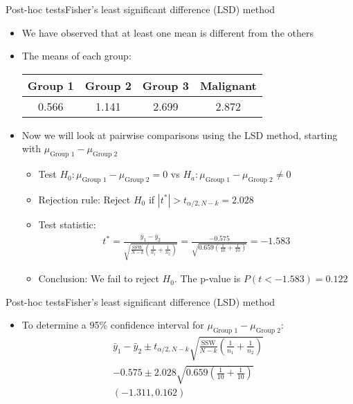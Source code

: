 \documentclass[xcolor=dvipsnames]{beamer}
\begin{document}
\begin{frame}{Post-hoc tests}{Fisher's least significant difference (LSD) method}
	\begin{itemize}
		\item We have observed that at least one mean is different from the others \pause
		\item The means of each group: \pause
		\begin{center}
			\begin{tabular}{|c|c|c|c|}
				\hline 
				  Group 1 & Group 2 & Group 3 & Malignant \\ \hline \hline
				 0.566 & 1.141 & 2.699 &  2.872 \\ \hline
			\end{tabular}
		\end{center} \pause
	\vspace{2mm}
		\item Now we will look at pairwise comparisons using the LSD method, starting with $\mu_{\text{Group 1}}-\mu_{\text{Group 2}}$ \pause
		\begin{itemize}
			\item Test $H_0: \mu_{\text{Group 1}}-\mu_{\text{Group 2}} =0$ vs $H_a: \mu_{\text{Group 1}}-\mu_{\text{Group 2}}\neq 0$ \pause
			\item Rejection rule: Reject $H_0$ if $|t^*| > t_{\alpha/2, N-k} = 2.028$ \pause
			\item Test statistic: \pause
			\begin{gather*}
			t^* = \frac{\bar{y}_1 - \bar{y}_2}{\sqrt{\frac{\text{SSW}}{N-k} \left(\frac{1}{n_1}+\frac{1}{n_2}\right)}} = 
			\frac{-0.575}{\sqrt{0.659 \left(\frac{1}{10}+\frac{1}{10}\right)}} = -1.583
			\end{gather*}\pause
			\item Conclusion: We fail to reject $H_0$. The p-value is $P(t < -1.583) = 0.122$
		\end{itemize}
	\end{itemize}
\end{frame}

\begin{frame}{Post-hoc tests}{Fisher's least significant difference (LSD) method}
	\begin{itemize}
		\item To determine a 95\% confidence interval for $\mu_{\text{Group 1}}-\mu_{\text{Group 2}}$: \pause
		\begin{gather*}
		\bar{y}_1 - \bar{y}_2 \pm t_{\alpha / 2, N - k}{\sqrt{\frac{\text{SSW}}{N-k} \left(\frac{1}{n_1}+\frac{1}{n_2}\right)}} \\
		-0.575 \pm 2.028\sqrt{0.659 \left(\frac{1}{10}+\frac{1}{10}\right)} \\
		(-1.311,  0.162)
		\end{gather*}
	\end{itemize}
\end{frame}
\end{document}
